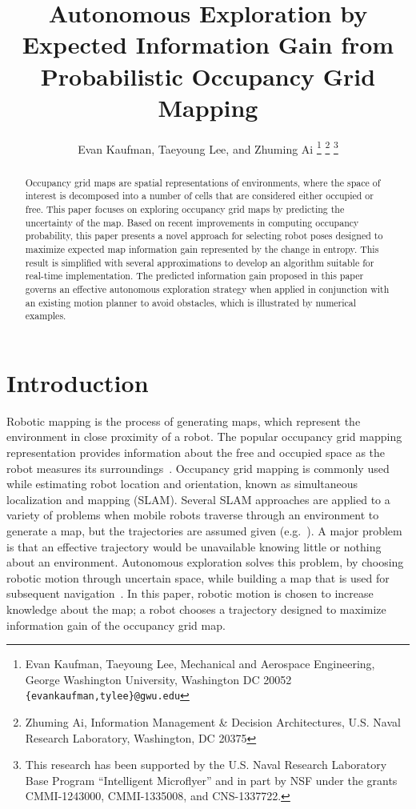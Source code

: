 \documentclass[letterpaper, 10pt, conference]{ieeeconf}
\title{\LARGE \bf
Autonomous Exploration by Expected Information Gain from Probabilistic Occupancy Grid Mapping
}
\author{Evan Kaufman, Taeyoung Lee, and Zhuming Ai%
\thanks{Evan Kaufman, Taeyoung Lee, Mechanical and Aerospace Engineering, George Washington University, Washington DC 20052 {\tt \{evankaufman,tylee\}@gwu.edu}}
\thanks{Zhuming Ai, Information Management \& Decision Architectures, U.S. Naval Research Laboratory,  Washington, DC 20375}
\thanks{This research has been supported by the U.S. Naval Research Laboratory Base Program ``Intelligent Microflyer'' and in part by NSF under the grants CMMI-1243000, CMMI-1335008, and CNS-1337722.}
}
\begin{document}
\maketitle
\thispagestyle{empty}
\pagestyle{empty}


\begin{abstract}
Occupancy grid maps are spatial representations of environments, where the space of interest is decomposed into a number of cells that are considered either occupied or free. This paper focuses on exploring occupancy grid maps by predicting the uncertainty of the map. Based on recent improvements in computing occupancy probability, this paper presents a novel approach for selecting robot poses designed to maximize expected map information gain represented by the change in entropy. This result is simplified with several approximations to develop an algorithm suitable for real-time implementation. The predicted information gain proposed in this paper governs an effective autonomous exploration strategy when applied in conjunction with an existing motion planner to avoid obstacles, which is illustrated by numerical examples.
\end{abstract}


\section{Introduction}

Robotic mapping is the process of generating maps, which represent the environment in close proximity of a robot. The popular occupancy grid mapping representation provides information about the free and occupied space as the robot measures its surroundings~\cite{ThrBurFox05}. Occupancy grid mapping is commonly used while estimating robot location and orientation, known as simultaneous localization and mapping (SLAM). Several SLAM approaches are applied to a variety of problems when mobile robots traverse through an environment to generate a map, but the trajectories are assumed given (e.g.~\cite{ThrBurFox05,DurBai06,CheChe09}). A major problem is that an effective trajectory would be unavailable knowing little or nothing about an environment. 
Autonomous exploration solves this problem, by choosing robotic motion through uncertain space, while building a map that is used for subsequent navigation~\cite{Yam97}.
In this paper, robotic motion is chosen to increase knowledge about the map; a robot chooses a trajectory designed to maximize information gain of the occupancy grid map.
\end{document}
